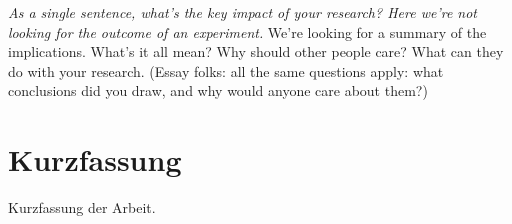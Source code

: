 \emph{As a single sentence, what’s the key impact of your research?
  Here we’re not looking for the outcome of an experiment.
}
We’re looking for a summary of the implications.
What’s it all mean?
Why should other people care?
What can they do with your research.
(Essay folks: all the same questions apply: what conclusions did you draw, and why would anyone care about them?)


\section*{Kurzfassung}
\begin{otherlanguage}{ngerman}
  Kurzfassung der Arbeit.
\end{otherlanguage}



%
%
\tableofcontents

\listoffigures

\listoftables
\listoflistings


\printglossary[type=\acronymtype,title={Abbreviations}]


\renewcommand*{\chapterpagestyle}{scrplain}
\pagestyle{scrheadings}

